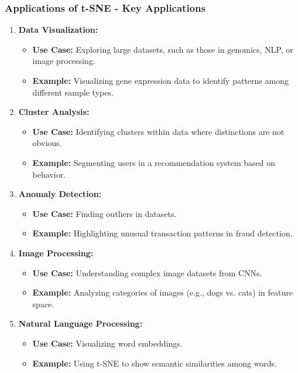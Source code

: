 \documentclass[aspectratio=169]{beamer}
\begin{document}
\begin{frame}[fragile]
    \frametitle{Applications of t-SNE - Key Applications}
    \begin{enumerate}
        \item \textbf{Data Visualization:}
        \begin{itemize}
            \item \textbf{Use Case:} Exploring large datasets, such as those in genomics, NLP, or image processing.
            \item \textbf{Example:} Visualizing gene expression data to identify patterns among different sample types.
        \end{itemize}
        
        \item \textbf{Cluster Analysis:}
        \begin{itemize}
            \item \textbf{Use Case:} Identifying clusters within data where distinctions are not obvious.
            \item \textbf{Example:} Segmenting users in a recommendation system based on behavior.
        \end{itemize}
        
        \item \textbf{Anomaly Detection:}
        \begin{itemize}
            \item \textbf{Use Case:} Finding outliers in datasets.
            \item \textbf{Example:} Highlighting unusual transaction patterns in fraud detection.
        \end{itemize}
        
        \item \textbf{Image Processing:}
        \begin{itemize}
            \item \textbf{Use Case:} Understanding complex image datasets from CNNs.
            \item \textbf{Example:} Analyzing categories of images (e.g., dogs vs. cats) in feature space.
        \end{itemize}

        \item \textbf{Natural Language Processing:}
        \begin{itemize}
            \item \textbf{Use Case:} Visualizing word embeddings.
            \item \textbf{Example:} Using t-SNE to show semantic similarities among words.
        \end{itemize}
    \end{enumerate}
\end{frame}
\end{document}
